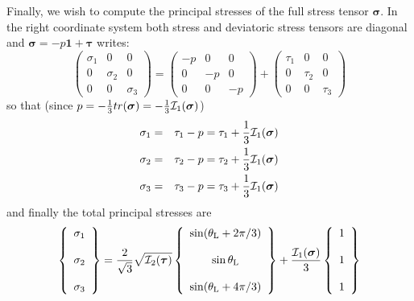 Finally, we wish to compute the principal stresses of the full stress tensor ${\bm \sigma}$.
In the right coordinate system both stress and deviatoric stress tensors are diagonal and 
${\bm \sigma}=-p {\bm 1} + {\bm \tau}$ writes:
\[
\left(
\begin{array}{ccc}
\sigma_1 &0 &0 \\
0& \sigma_2 &0 \\
0&0 & \sigma_3  
\end{array}
\right)
=
\left(
\begin{array}{ccc}
-p&0&0\\
0&-p&0\\
0&0&-p
\end{array}
\right)
+
\left(
\begin{array}{ccc}
\tau_1 & 0&0 \\
0& \tau_2 & 0\\
0&0 & \tau_3  
\end{array}
\right)
\]
so that (since $p=-\frac{1}{3}tr({\bm \sigma})=-\frac{1}{3}{\cal I}_1({\bm \sigma})$) 
\begin{eqnarray}
\sigma_1 &=& \tau_1 - p = \tau_1 + \frac{1}{3}{\cal I}_1({\bm \sigma})\\ 
\sigma_2 &=& \tau_2 - p = \tau_2 + \frac{1}{3}{\cal I}_1({\bm \sigma})\\ 
\sigma_3 &=& \tau_3 - p = \tau_3 + \frac{1}{3}{\cal I}_1({\bm \sigma}) 
\end{eqnarray}
and finally the total principal stresses are
\begin{equation}
\left\{
\begin{array}{c}
\sigma_1 \\ \\
\sigma_2 \\ \\
\sigma_3
\end{array}
\right\}
= \frac{2  }{\sqrt{3}}\sqrt{ {\cal I}_2({\bm \tau})  }
\left\{
\begin{array}{c}
\sin (\theta_{\rm L} + 2\pi/3)  \\ \\
\sin \theta_{\rm L}   \\ \\
\sin (\theta_{\rm L} + 4\pi/3  )
\end{array}
\right\}
+
\frac{{\cal I}_1({\bm \sigma})}{3}
\left\{
\begin{array}{c}
1 \\ \\
1 \\ \\
1
\end{array}
\right\}
\end{equation}
